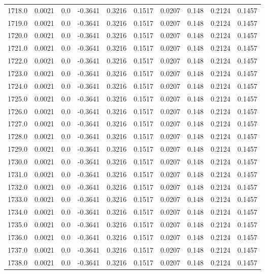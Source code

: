 \begin{longtable}{lrrrrrrrrr}
1718.0 & 0.0021 & 0.0 & -0.3641 & 0.3216 & 0.1517 & 0.0207 & 0.148 & 0.2124 & 0.1457 \\
1719.0 & 0.0021 & 0.0 & -0.3641 & 0.3216 & 0.1517 & 0.0207 & 0.148 & 0.2124 & 0.1457 \\
1720.0 & 0.0021 & 0.0 & -0.3641 & 0.3216 & 0.1517 & 0.0207 & 0.148 & 0.2124 & 0.1457 \\
1721.0 & 0.0021 & 0.0 & -0.3641 & 0.3216 & 0.1517 & 0.0207 & 0.148 & 0.2124 & 0.1457 \\
1722.0 & 0.0021 & 0.0 & -0.3641 & 0.3216 & 0.1517 & 0.0207 & 0.148 & 0.2124 & 0.1457 \\
1723.0 & 0.0021 & 0.0 & -0.3641 & 0.3216 & 0.1517 & 0.0207 & 0.148 & 0.2124 & 0.1457 \\
1724.0 & 0.0021 & 0.0 & -0.3641 & 0.3216 & 0.1517 & 0.0207 & 0.148 & 0.2124 & 0.1457 \\
1725.0 & 0.0021 & 0.0 & -0.3641 & 0.3216 & 0.1517 & 0.0207 & 0.148 & 0.2124 & 0.1457 \\
1726.0 & 0.0021 & 0.0 & -0.3641 & 0.3216 & 0.1517 & 0.0207 & 0.148 & 0.2124 & 0.1457 \\
1727.0 & 0.0021 & 0.0 & -0.3641 & 0.3216 & 0.1517 & 0.0207 & 0.148 & 0.2124 & 0.1457 \\
1728.0 & 0.0021 & 0.0 & -0.3641 & 0.3216 & 0.1517 & 0.0207 & 0.148 & 0.2124 & 0.1457 \\
1729.0 & 0.0021 & 0.0 & -0.3641 & 0.3216 & 0.1517 & 0.0207 & 0.148 & 0.2124 & 0.1457 \\
1730.0 & 0.0021 & 0.0 & -0.3641 & 0.3216 & 0.1517 & 0.0207 & 0.148 & 0.2124 & 0.1457 \\
1731.0 & 0.0021 & 0.0 & -0.3641 & 0.3216 & 0.1517 & 0.0207 & 0.148 & 0.2124 & 0.1457 \\
1732.0 & 0.0021 & 0.0 & -0.3641 & 0.3216 & 0.1517 & 0.0207 & 0.148 & 0.2124 & 0.1457 \\
1733.0 & 0.0021 & 0.0 & -0.3641 & 0.3216 & 0.1517 & 0.0207 & 0.148 & 0.2124 & 0.1457 \\
1734.0 & 0.0021 & 0.0 & -0.3641 & 0.3216 & 0.1517 & 0.0207 & 0.148 & 0.2124 & 0.1457 \\
1735.0 & 0.0021 & 0.0 & -0.3641 & 0.3216 & 0.1517 & 0.0207 & 0.148 & 0.2124 & 0.1457 \\
1736.0 & 0.0021 & 0.0 & -0.3641 & 0.3216 & 0.1517 & 0.0207 & 0.148 & 0.2124 & 0.1457 \\
1737.0 & 0.0021 & 0.0 & -0.3641 & 0.3216 & 0.1517 & 0.0207 & 0.148 & 0.2124 & 0.1457 \\
1738.0 & 0.0021 & 0.0 & -0.3641 & 0.3216 & 0.1517 & 0.0207 & 0.148 & 0.2124 & 0.1457 \\

\end{longtable}
